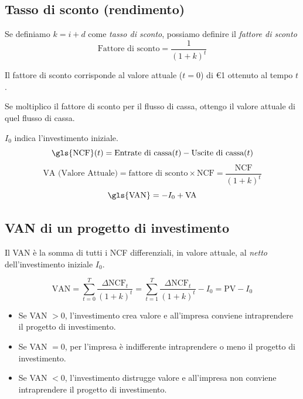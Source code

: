 \subsection{Tasso di sconto (rendimento)}
Se definiamo $k=i+d$ come \emph{tasso di sconto}, possiamo definire il \emph{fattore di sconto}
\[\text{Fattore di sconto} = \frac{1}{(1+k)^t}\]

Il fattore di sconto corrisponde al valore attuale ($t=0$) di \euro 1 ottenuto al tempo $t$.

Se moltiplico il fattore di sconto per il flusso di cassa, ottengo il valore attuale di quel flusso di cassa.

$I_0$ indica l'investimento iniziale.
\begin{equation*}
    \text{\gls{NCF}}(t) = \text{Entrate di cassa}(t) - \text{Uscite di cassa}(t)
\end{equation*}
\begin{equation*}
    \text{VA (Valore Attuale)} = \text{fattore di sconto} \times \text{NCF} = \frac{\text{NCF}}{(1+k)^t}
\end{equation*}
\begin{equation*}
    \text{\gls{VAN}} = -I_0 + \text{VA}
\end{equation*}

\subsection{VAN di un progetto di investimento}

Il \gls{VAN} è la somma di tutti i \gls{NCF} differenziali, in valore attuale, al \emph{netto} dell’investimento iniziale $I_0$.

\begin{equation*}
    \text{VAN} = \sum^T_{t=0} \frac{\Delta\text{NCF}_t}{(1+k)^t}
    = \sum^T_{t=1} \frac{\Delta\text{NCF}_t}{(1+k)^t} - I_0
    = \text{PV} - I_0
\end{equation*}

\begin{itemize}
    \item Se VAN $> 0$, l’investimento crea valore e all’impresa conviene intraprendere il progetto di investimento.
    \item Se VAN $= 0$, per l’impresa è indifferente intraprendere o meno il progetto di investimento.
    \item Se VAN $< 0$, l’investimento distrugge valore e all’impresa non conviene intraprendere il progetto di investimento.
\end{itemize}

